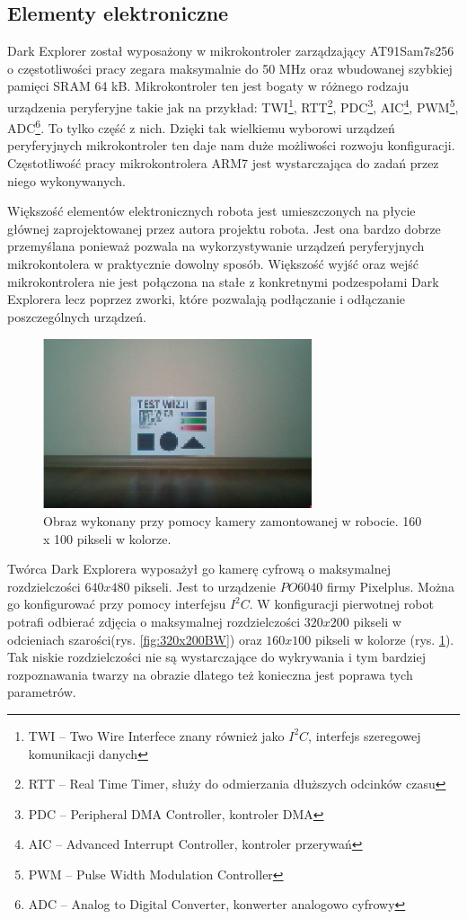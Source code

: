\subsection{Elementy elektroniczne}
Dark Explorer został wyposażony w mikrokontroler zarządzający AT91Sam7s256 o częstotliwości pracy zegara maksymalnie do 50 MHz oraz wbudowanej szybkiej pamięci SRAM 64 kB. Mikrokontroler ten jest bogaty w różnego rodzaju urządzenia peryferyjne takie jak na przykład: TWI\footnote{TWI -- Two Wire Interfece znany również jako $I^{2}C$, interfejs szeregowej komunikacji danych}, RTT\footnote{RTT -- Real Time Timer, służy do odmierzania dłuższych odcinków czasu}, PDC\footnote{PDC -- Peripheral DMA Controller, kontroler DMA}, AIC\footnote{AIC -- Advanced Interrupt Controller, kontroler przerywań}, PWM\footnote{PWM -- Pulse Width Modulation Controller}, ADC\footnote{ADC -- Analog to Digital Converter, konwerter analogowo cyfrowy}. To tylko część z nich. Dzięki tak wielkiemu wyborowi urządzeń peryferyjnych mikrokontroler ten daje nam duże możliwości rozwoju konfiguracji. Częstotliwość pracy mikrokontrolera ARM7 jest wystarczająca do zadań przez niego wykonywanych.

Większość elementów elektronicznych robota jest umieszczonych na płycie głównej zaprojektowanej przez autora projektu robota. Jest ona bardzo dobrze przemyślana ponieważ pozwala na wykorzystywanie urządzeń peryferyjnych mikrokontolera w praktycznie dowolny sposób. Większość wyjść oraz wejść mikrokontrolera nie jest połączona na stałe z konkretnymi podzespołami Dark Explorera lecz poprzez zworki, które pozwalają podłączanie i odłączanie poszczególnych urządzeń.

\begin{figure}[!ht]
 \centering
 \includegraphics[height=50mm]{../images/ch02/160x100C.jpg}
 \caption{Obraz wykonany przy pomocy kamery zamontowanej w robocie. 160 x 100 pikseli w kolorze. \cite{KmakMScThesis2009}}
 \label{fig:160x100C}
\end{figure}

Twórca Dark Explorera wyposażył go kamerę cyfrową o maksymalnej rozdzielczości $640x480$ pikseli. Jest to urządzenie $PO6040$ firmy Pixelplus. Można go konfigurować przy pomocy interfejsu $I^{2}C$. W konfiguracji pierwotnej robot potrafi odbierać zdjęcia o maksymalnej rozdzielczości $320x200$ pikseli w odcieniach szarości(rys. \ref{fig:320x200BW}) oraz $160x100$ pikseli w kolorze (rys. \ref{fig:160x100C}). Tak niskie rozdzielczości nie są wystarczające do wykrywania i tym bardziej rozpoznawania twarzy na obrazie dlatego też konieczna jest poprawa tych parametrów.

